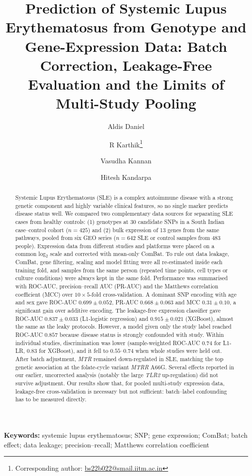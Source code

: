 \documentclass[11pt]{article}
\title{Prediction of Systemic Lupus Erythematosus from Genotype and Gene-Expression Data: Batch Correction, Leakage-Free Evaluation and the Limits of Multi-Study Pooling}
\author[1]{Aldis Daniel}
\author[1]{R Karthik\thanks{Corresponding author: \href{mailto:bs22b022@smail.iitm.ac.in}{bs22b022@smail.iitm.ac.in}}}
\author[1]{Vasudha Kannan}
\author[1]{Hitesh Kandarpa}
\affil[1]{Indian Institute of Technology Madras, Chennai, India}
\date{}
\begin{document}
\maketitle

\begin{abstract}
\noindent Systemic Lupus Erythematosus (SLE) is a complex autoimmune disease with a strong genetic component and highly variable clinical features, so no single marker predicts disease status well. We compared two complementary data sources for separating SLE cases from healthy controls: (1) genotypes at 30 candidate SNPs in a South Indian case--control cohort ($n = 425$) and (2) bulk expression of 13 genes from the same pathways, pooled from six GEO series ($n = 642$ SLE or control samples from 483 people). Expression data from different studies and platforms were placed on a common log$_2$ scale and corrected with mean-only ComBat. To rule out data leakage, ComBat, gene filtering, scaling and model fitting were all re-estimated inside each training fold, and samples from the same person (repeated time points, cell types or culture conditions) were always kept in the same fold. Performance was summarised with ROC-AUC, precision--recall AUC (PR-AUC) and the Matthews correlation coefficient (MCC) over $10\times5$-fold cross-validation. A dominant SNP encoding with age and sex gave ROC-AUC $0.699 \pm 0.052$, PR-AUC $0.668 \pm 0.063$ and MCC $0.31 \pm 0.10$, a significant gain over additive encoding. The leakage-free expression classifier gave ROC-AUC $0.837 \pm 0.033$ (L1-logistic regression) and $0.915 \pm 0.021$ (XGBoost), almost the same as the leaky protocols. However, a model given only the study label reached ROC-AUC $0.857$ because disease status is strongly confounded with study. Within individual studies, discrimination was lower (sample-weighted ROC-AUC $0.74$ for L1-LR, $0.83$ for XGBoost), and it fell to $0.55$--$0.74$ when whole studies were held out. After batch adjustment, \textit{MTR} remained down-regulated in SLE, matching the top genetic association at the folate-cycle variant \textit{MTRR} A66G. Several effects reported in our earlier, uncorrected analysis (notably the large \textit{TLR2} up-regulation) did not survive adjustment. Our results show that, for pooled multi-study expression data, leakage-free cross-validation is necessary but not sufficient: batch--label confounding has to be measured directly.
\end{abstract}

\noindent\textbf{Keywords:} systemic lupus erythematosus; SNP; gene expression; ComBat; batch effect; data leakage; precision--recall; Matthews correlation coefficient
\end{document}
